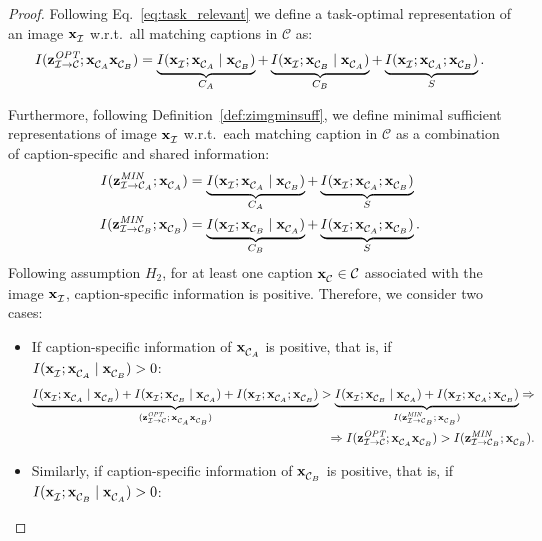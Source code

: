 \begin{proof} 
Following Eq.~\ref{eq:task_relevant} we define a task-optimal representation of an image $\img{}{}$ w.r.t.\ all matching captions in $\mathcal{C}$ as:
	\begin{align*}
		I(\zoptimal{}{\mathcal{C}} ; \capt{}{A}\capt{}{B} )
		 =
		 \underbrace{ I( \img{}{} ; \capt{}{A} \mid \capt{}{B}) }_{\textit{$C_A$}}
		+
		\underbrace{I( \img{}{} ; \capt{}{B} \mid \capt{}{A})}_{\textit{$C_B$}}
		+
		\underbrace{I( \img{}{} ; \capt{}{A} ;  \capt{}{B})}_{\textit{$S$}}.
	\end{align*}

Furthermore, following Definition~\ref{def:zimgminsuff}, we define minimal sufficient representations of image $\img{}{}$ w.r.t.\ each matching caption in $\mathcal{C}$ as a combination of caption-specific and shared information:
	\begin{align*}
		I(\zminsuff{A} ; \capt{}{A})
		 & =
		 \underbrace{I(\img{}{} ; \capt{}{A} \mid \capt{}{B})}_{\textit{$C_A$}}
		+
		\underbrace{I(\img{}{} ; \capt{}{A} ; \capt{}{B})}_{\textit{$S$}} 
		\\
		I(\zminsuff{B} ; \capt{}{B})
		& =
		 \underbrace{I(\img{}{} ; \capt{}{B} \mid \capt{}{A})}_{\textit{$C_B$}}
		+
		\underbrace{ I(\img{}{} ; \capt{}{A} ; \capt{}{B}) }_{\textit{$S$}}.
	\end{align*}
Following assumption $H_2$, for at least one caption $\capt{}{} \in \mathcal{C}$ associated with the image $\img{}{}$, caption-specific information is positive. Therefore, we consider two cases:
\begin{itemize}
\item If caption-specific information of $\capt{}{A}$ is positive, that is, if $I( \img{}{} ; \capt{}{A} \mid \capt{}{B}) > 0$:
	\begin{align*}
	\underbrace{I( \img{}{} ; \capt{}{A} \mid \capt{}{B}) + I( \img{}{} ; \capt{}{B} \mid \capt{}{A}) + I( \img{}{} ; \capt{}{A} ;  \capt{}{B})}_{\textit{$(\zoptimal{}{\mathcal{C}} ; \capt{}{A}\capt{}{B} )$}}
	>
	\underbrace{ I(\img{}{} ; \capt{}{B} \mid \capt{}{A}) + I(\img{}{} ; \capt{}{A} ; \capt{}{B}) }_{\textit{$I(\zminsuff{B} ; \capt{}{B})$} } \Rightarrow \\
	\Rightarrow
	I( \zoptimal{}{\mathcal{C}} ; \capt{}{A}\capt{}{B} ) > I(\zminsuff{B} ; \capt{}{B}).
	\end{align*}

\item Similarly, if caption-specific information of $\capt{}{B}$ is positive, that is, if $I( \img{}{} ; \capt{}{B} \mid \capt{}{A}) > 0$:


\end{itemize}
\end{proof}
